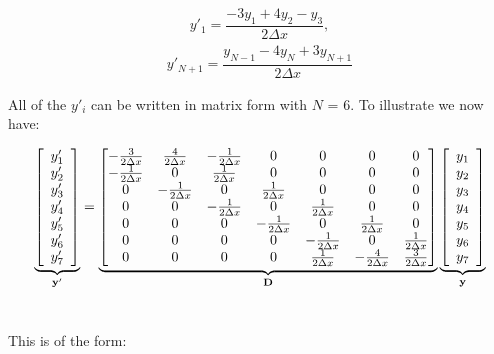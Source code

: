 \documentclass[12pt]{article}
\begin{document}
\begin{eqnarray}
y'_{1} = \dfrac{-3y_{1}+4y_{2}-y_{3}}{2\Delta{x}}, \label{ee2}
\end{eqnarray}
\begin{eqnarray}
y'_{N+1} = \dfrac{y_{N-1}-4y_{N}+3y_{N+1}}{2\Delta{x}} \label{ee3}
\end{eqnarray}

\noindent
All of the $y'_{i}$ can be written in matrix form with $N$ = 6. To illustrate we now have:

$$\underbrace{
\left[ \begin{array}{c} 
	y'_{1} \\ 
	y'_{2} \\ 
	y'_{3} \\
	y'_{4} \\
	y'_{5} \\
	y'_{6} \\
	y'_{7} 
\end{array} \right]}_{\textbf y'} = 
\underbrace{
\begin{bmatrix} 
	-\frac{3}{2\Delta{x}} & \frac{4}{2\Delta{x}} & -\frac{1}{2\Delta{x}} & 0 & 0 & 0 & 0 \\
	-\frac{1}{2\Delta{x}} & 0 & \frac{1}{2\Delta{x}} & 0 & 0 & 0 & 0 \\
	0 & -\frac{1}{2\Delta{x}} & 0 & \frac{1}{2\Delta{x}} & 0 & 0 & 0 \\
	0 & 0 & -\frac{1}{2\Delta{x}} & 0 & \frac{1}{2\Delta{x}} & 0 & 0 \\
	0 & 0 & 0 & -\frac{1}{2\Delta{x}} & 0 & \frac{1}{2\Delta{x}} & 0 \\
	0 & 0 & 0 & 0 & -\frac{1}{2\Delta{x}} & 0 & \frac{1}{2\Delta{x}} \\
	0 & 0 & 0 & 0 & \frac{1}{2\Delta{x}} & -\frac{4}{2\Delta{x}} & \frac{3}{2\Delta{x}}
\end{bmatrix}}_{\textbf D}
\underbrace{
\left[ \begin{array}{c} 
	y_{1} \\ 
	y_{2} \\ 
	y_{3} \\ 
	y_{4} \\ 
	y_{5} \\ 
	y_{6} \\ 
	y_{7}
\end{array} \right]}_{\textbf y}$$
\\
\begin{doublespace}
\noindent
This is of the form:
\end{doublespace}
\end{document}
